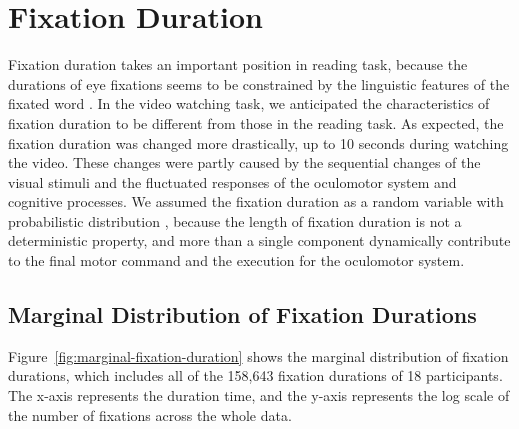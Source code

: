 \documentclass[oneside,master]{snueethesis}
\begin{document}
\chapter{Fixation Duration}
\label{sec:fixation-duration}

Fixation duration takes an important position in reading task, because the durations of eye fixations seems to be constrained by the linguistic features of the fixated word \cite{Rayner1986,Inhoff1986}. In the video watching task, we anticipated the characteristics of fixation duration to be different from those in the reading task. As expected, the fixation duration was changed more drastically, up to 10 seconds during watching the video. These changes were partly caused by the sequential changes of the visual stimuli and the fluctuated responses of the oculomotor system and cognitive processes. We assumed the fixation duration as a random variable with probabilistic distribution \cite{Rayner1998,Reichle2004,Reichle2006}, because the length of fixation duration is not a deterministic property, and more than a single component dynamically contribute to the final motor command and the execution for the oculomotor system.


\section{Marginal Distribution of Fixation Durations}

Figure~\ref{fig:marginal-fixation-duration} shows the marginal distribution of fixation durations, which includes all of the 158,643 fixation durations of 18 participants. The x-axis represents the duration time, and the y-axis represents the log scale of the number of fixations across the whole data.
\end{document}
